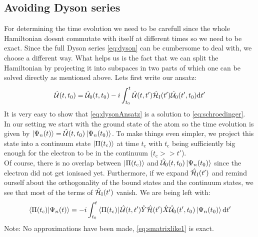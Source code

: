 \subsection{Avoiding Dyson series}
For determining the time evolution we need to be carefull since the whole Hamiltonian doesnt commutate with itself at different times so we need to be exact. 
Since the full Dyson series \eqref{eq:dyson} can be cumbersome to deal with, we choose a different way. 
What helps us is the fact that we can split the Hamiltonian by projecting it into subspaces in two parts of which one can be solved directly as mentioned above. 
Lets first write our ansatz:
\begin{equation}
    \hat{\mathcal{U}}(t,t_0)=\hat{\mathcal{U}}_0(t,t_0)-i\int_{t_0}^{t} \hat{\mathcal{U}}(t,t')\hat{\mathcal{H}}_{\mathrm{I}}(t')\hat{\mathcal{U}}_0(t',t_0) \mathrm{d} t'       \label{eq:dysonAnsatz}
\end{equation}
It is very easy to show that \eqref{eq:dysonAnsatz} is a solution to \eqref{eq:schroedinger}.\\
In our setting we start with the ground state of the atom so the time evolution is given by $\ket{\Psi_n(t)}=\hat{\mathcal{U}}(t,t_0)\ket{\Psi_n(t_0)}$.
To make things even simpler, we project this state into a continuum state $\ket{\Pi(t_{\mathrm{c}})}$ at time $t_{\mathrm{c}}$ with $t_{\mathrm{c}}$ being sufficiently big enough for the electron to be in the continuum ($t_{\mathrm{c}} >> t'$).\\
Of course, there is no overlap between $\ket{\Pi(t_{\mathrm{c}})}$ and $\hat{\mathcal{U}}_0(t,t_0)\ket{\Psi_n(t_0)}$ since the electron did not get ionisaed yet. 
Furthermore, if we expand $\hat{\mathcal{H}}_{\mathrm{I}}(t')$ and remind ourself about the orthogonality of the bound states and the continuum states, we see that most of the terms of $\hat{\mathcal{H}}_{\mathrm{I}}(t')$ vanish.
We are being left with:
\begin{equation}
    \braket{\Pi(t_{\mathrm{c}})|\Psi_n(t)} = -i \int_{t_0}^{t} \bra{\Pi(t_{\mathrm{c}})}\hat{\mathcal{U}}(t,t')\hat{Y}\hat{\mathcal{H}}(t')\hat{X}\hat{\mathcal{U}}_0(t',t_0)\ket{\Psi_n(t_0)} \mathrm{d} t' \label{eq:smatrixlike1}
\end{equation}
Note: No approximations have been made, \eqref{eq:smatrixlike1} is exact.




